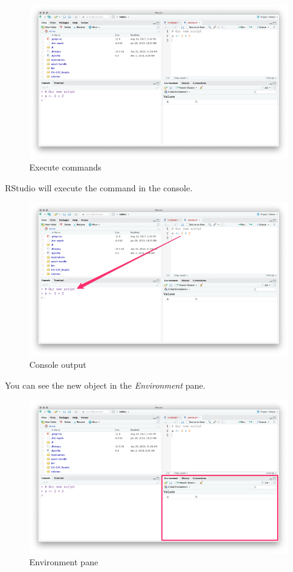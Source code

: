 \documentclass[]{book}
\begin{document}
\begin{figure}
\centering
\includegraphics{img/rstudio_source_ex.png}
\caption{Execute commands}
\end{figure}

RStudio will execute the command in the console.

\begin{figure}
\centering
\includegraphics{img/rstudio_source_ex2.png}
\caption{Console output}
\end{figure}

You can see the new object in the \emph{Environment} pane.

\begin{figure}
\centering
\includegraphics{img/rstudio_source_ex3.png}
\caption{Environment pane}
\end{figure}
\end{document}
